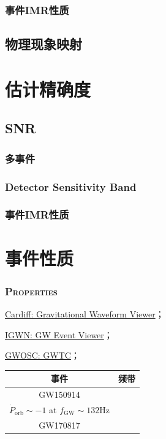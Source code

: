 \documentclass[CJK,aspectratio=169]{beamer}  %
\begin{document}
\subsubsection{事件IMR性质}

\subsection{物理现象映射}



\section{估计精确度}
\subsection{SNR}

\subsubsection{多事件}
\subsubsection{Detector Sensitivity Band}
\subsubsection{事件IMR性质}


\section{事件性质}
\begin{frame}[allowframebreaks]
	\frametitle{\textsc{Properties}}
	\begin{tcolorbox}
		\par \href{https://waveview.cardiffgravity.org/}{Cardiff: Gravitational Waveform Viewer}；
		\par \href{https://peviewer.igwn.org/}{IGWN: GW Event Viewer}；
		\par \href{https://gwosc.org/eventapi/html/GWTC/?page=1&pagesize=100}{GWOSC: GWTC}；
	\end{tcolorbox}

		\begin{table}[h!]
			\begin{center}
				\begin{tabular}{|c|c|}
					\hline
					事件 & 频带 \\
					\hline
					GW150914 & \makecell{$\dot{P}_\text{orb} \sim -0.1$ at $f_\text{GW} \sim 30 \text{Hz}$\\ $\dot{P}_\text{orb} \sim -1$ at $f_\text{GW} \sim 132 \text{Hz}$} \\
					\hline
					GW170817 & \\
					\hline
				\end{tabular}
			\end{center}
		\end{table}
\end{frame}
\end{document}
